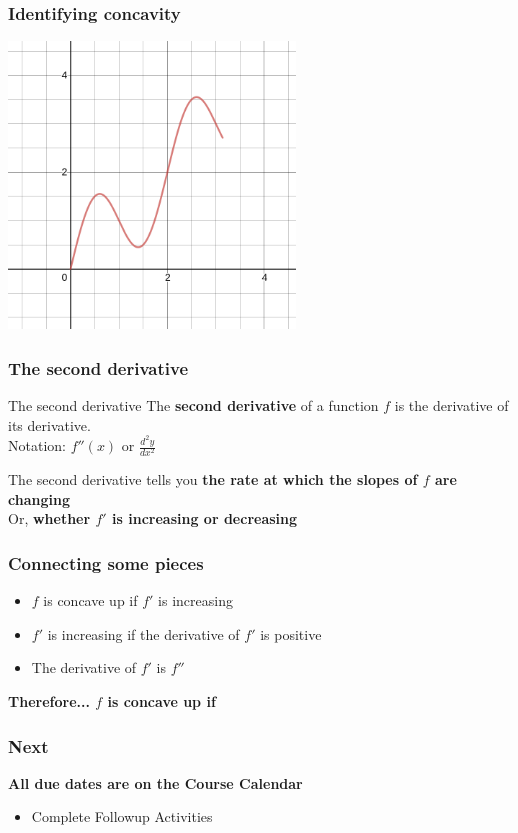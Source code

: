 \documentclass{beamer}
\begin{document}
\begin{frame}
    \frametitle{Identifying concavity}

    \begin{center}
        \includegraphics[width=3in]{concavity.png}
    \end{center}

\end{frame}

\begin{frame}
    \frametitle{The second derivative}

    \begin{block}{The second derivative}
        The \textbf{second derivative} of a function $f$ is the derivative of its derivative. \\
        Notation: $f''(x)$ or $\displaystyle{\frac{d^2y}{dx^2}}$
    \end{block}

    The second derivative tells you \textbf{the rate at which the slopes of $f$ are changing} \\

    Or, \textbf{whether $f'$ is increasing or decreasing}

\end{frame}

\begin{frame}
    \frametitle{Connecting some pieces}

    \begin{itemize}
        \item<1-> $f$ is concave up if $f'$ is increasing 
        \item<2-> $f'$ is increasing if the derivative of $f'$ is positive 
        \item<3-> The derivative of $f'$ is $f''$
    \end{itemize} \pause

    \textbf{Therefore... $f$ is concave up if}

\end{frame}


\begin{frame}
    \frametitle{Next}

\textbf{All due dates are on the Course Calendar}


    \begin{itemize}
        \item Complete Followup Activities
    \end{itemize}

\end{frame}
 
\end{document}
